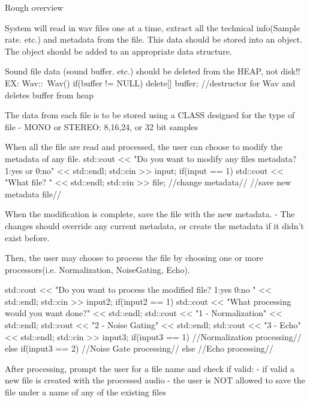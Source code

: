 Rough overview \begin{DoxyVerb}System will read in wav files one at a time, extract all the technical info(Sample rate. etc.) and metadata from the file.
This data should be stored into an object.
The object should be added to an appropriate data structure.


Sound file data (sound buffer. etc.) should be deleted from the HEAP, not disk!!
    EX:     Wav::~Wav() {
                 if(buffer != NULL){
                    delete[] buffer;
                 }  
            }//destructor for Wav and deletes buffer from heap 



The data from each file is to be stored using a CLASS designed for the type of file 
    - MONO or STEREO: 8,16,24, or 32 bit samples

When all the file are read and processed, the user can choose to modify the metadata of any file.
        std::cout << "Do you want to modify any files metadata? 1:yes or 0:no" << std::endl;
        std::cin >> input;
        if(input == 1){    
            std::cout << "What file? " << std::endl;
            std::cin >> file;
            //change metadata//
            //save new metadata file//
        }

When the modification is complete, save the file with the new metadata.
    - The changes should override any current metadata, or create the metadata if it didn't exist before.

Then, the user may choose to process the file by choosing one or more processors(i.e. Normalization, NoiseGating, Echo).

    std::cout << "Do you want to process the modified file? 1:yes 0:no " << std::endl;
    std::cin >> input2;
    if(input2 == 1){
        std::cout << "What processing would you want done?" << std::endl;
        std::cout << "1 - Normalization" << std::endl;
        std::cout << "2 - Noise Gating" << std::endl;
        std::cout << "3 - Echo" << std::endl;
        std::cin >> input3;
        if(input3 == 1){
            //Normalization processing//
        }
        else if(input3 == 2){
            //Noise Gate processing//
        }
        else{
            //Echo processing//
        }
    }

After processing, prompt the user for a file name and check if valid:
    - if valid a new file is created with the processed audio 
    - the user is NOT allowed to save the file under a name of any of the existing files


\end{DoxyVerb}
